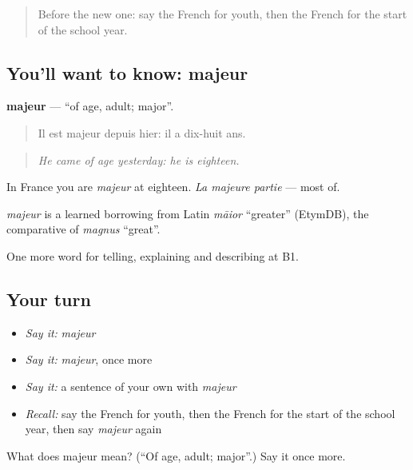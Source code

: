 \label{lesson:FR-C310-majeur}



\begin{quote}
Before the new one: say the French for youth, then the French for the start of the school year.
\end{quote}

\subsection*{You'll want to know: majeur}
\textbf{majeur} — \textquotedblleft{}of age, adult; major\textquotedblright{}.

\begin{quote}
Il est majeur depuis hier: il a dix-huit ans.
\end{quote}

\begin{quote}
\emph{He came of age yesterday: he is eighteen.}
\end{quote}

In France you are \emph{majeur} at eighteen. \emph{La majeure partie} — most of.

\begin{cousinweb}
\emph{majeur} is a learned borrowing from Latin \emph{māior} \textquotedblleft{}greater\textquotedblright{} (EtymDB), the comparative of \emph{magnus} \textquotedblleft{}great\textquotedblright{}.
\end{cousinweb}

\begin{grammarlens}[title={What you've built}]
One more word for telling, explaining and describing at B1.
\end{grammarlens}

\subsection*{Your turn}
\begin{itemize}
\raggedright
  \item \emph{Say it:} \emph{majeur}
  \item \emph{Say it:} \emph{majeur}, once more
  \item \emph{Say it:} a sentence of your own with \emph{majeur}
  \item \emph{Recall:} say the French for youth, then the French for the start of the school year, then say \emph{majeur} again
\end{itemize}

\begin{tcolorbox}[breakable,colback=teal!4,colframe=teal!35!black,title={Before you move on}]
What does majeur mean? (\textquotedblleft{}Of age, adult; major\textquotedblright{}.) Say it once more.
\end{tcolorbox}
